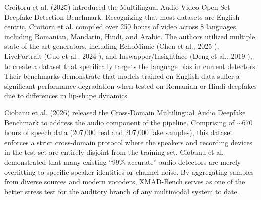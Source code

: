 \documentclass[12pt,a4paper]{report}
\begin{document}
\pagebreak
Croitoru et al. (2025) \cite{croitoru2025mavos} introduced the Multilingual Audio-Video Open-Set Deepfake Detection Benchmark. Recognizing that most datasets are English-centric, Croitoru et al. compiled over 250 hours of video across 8 languages, including Romanian, Mandarin, Hindi, and Arabic. The authors utilized multiple state-of-the-art generators, including EchoMimic (Chen et al., 2025 \cite{chen2025echomimic}), LivePortrait (Guo et al., 2024 \cite{guo2024liveportrait}), and Inswapper/Insightface (Deng et al., 2019 \cite{deng2019arcface, insightface_github}), to create a dataset that specifically targets the language bias in current detectors. Their benchmarks demonstrate that models trained on English data suffer a significant performance degradation when tested on Romanian or Hindi deepfakes due to differences in lip-shape dynamics.

Ciobanu et al. (2026) \cite{ciobanu2025xmad} released the Cross-Domain Multilingual Audio Deepfake Benchmark to address the audio component of the pipeline. Comprising of $\sim$670 hours of speech data (207,000 real and 207,000 fake samples), this dataset enforces a strict cross-domain protocol where the speakers and recording devices in the test set are entirely disjoint from the training set. Ciobanu et al. demonstrated that many existing ``99\% accurate'' audio detectors are merely overfitting to specific speaker identities or channel noise. By aggregating samples from diverse sources and modern vocoders, XMAD-Bench serves as one of the better stress test for the auditory branch of any multimodal system to date.
\end{document}
